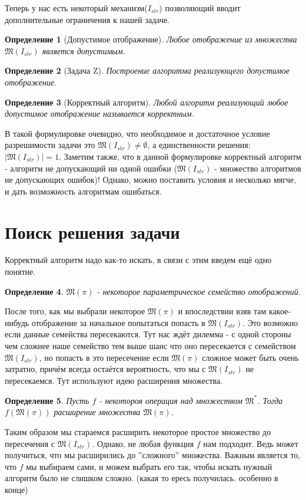 \documentclass[a4paper, 12pt]{report}
\newtheorem*{definition}{Определение}
\begin{document}
Теперь у нас есть некоторый механизм($I_{str}$) позволяющий вводит дополнительные ограничения к нашей задаче.
\begin{definition}[Допустимое отображение]Любое отображение из множества $\mathfrak{M}(I_{str})$ является допустимым. \end{definition}
\begin{definition}[Задача Z] Построение алгоритма реализующего допустимое отображение. \end{definition}
\begin{definition}[Корректный алгоритм] Любой алгоритм реализующий любое допустимое отображение называется корректным. \end{definition}

В такой формулировке очевидно, что необходимое и достаточное условие разрешимости задачи это $\mathfrak{M}(I_{str})\neq\emptyset$, а единственности решения: $|\mathfrak{M}(I_{str})|=1$.
Заметим также, что в данной формулировке корректный алгоритм - алгоритм не допускающий ни одной ошибки ($\mathfrak{M}(I_{str})$ - множество алгоритмов не допускающих ошибок)! Однако, можно поставить условия и несколько мягче, и дать возможность алгоритмам ошибаться.

\section{Поиск решения задачи}
Корректный алгоритм надо как-то искать, в связи с этим введем ещё одно понятие.

\begin{definition} $\mathfrak{M}(\pi)$ - некоторое параметрическое семейство отображений. \end{definition}

После того, как мы выбрали некоторое $\mathfrak{M}(\pi)$ и впоследствии взяв там какое-нибудь отображение за начальное попытаться попасть в $\mathfrak{M}(I_{str})$. Это возможно если данные семейства пересекаются. Тут нас ждёт дилемма - с одной стороны чем сложнее наше семейство тем выше шанс что оно пересекается с семейством $\mathfrak{M}(I_{str})$, но попасть в это пересечение если $\mathfrak{M}(\pi)$ сложное может быть очень затратно, причём всегда остаётся вероятность, что мы с $\mathfrak{M}(I_{str})$ не пересекаемся. Тут используют идею расширения множества.

\begin{definition} Пусть $f$ - некотороя операция над множеством $\mathfrak{M}^*$. Тогда $f(\mathfrak{M}(\pi))$ расширение множества $\mathfrak{M}(\pi)$. \end{definition}

Таким образом мы стараемся расширить некоторое простое множество до пересечения с $\mathfrak{M}(I_{str})$. Однако, не любая функция $f$ нам подходит. Ведь может получиться, что мы расширились до ''сложного'' множества. Важным является то, что $f$ мы выбираем сами, и можем выбрать его так, чтобы искать нужный алгоритм было не слишком сложно. (какая то ересь получилась. особенно в конце)
\end{document}
